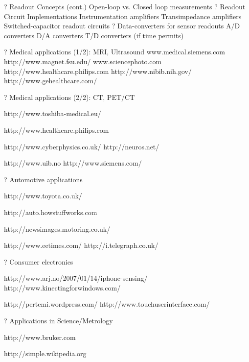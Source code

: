\documentclass[2pt,landscape]{article}
\begin{document}
\begin{multicols*}{5}
?	Readout Concepts (cont.)
\textbullet 	Open-loop vs. Closed loop measurements
?	Readout Circuit Implementations
\textbullet 	Instrumentation amplifiers
\textbullet 	Transimpedance amplifiers
\textbullet 	Switched-capacitor readout circuits
?	Data-converters for sensor readouts
\textbullet 	A/D converters
\textbullet 	D/A converters
\textbullet 	T/D converters (if time permits)



?	Medical applications (1/2): MRI, Ultrasound
www.medical.siemens.com	                    
http://www.magnet.fsu.edu/	www.sciencephoto.com
http://www.healthcare.philips.com	http://www.nibib.nih.gov/	http://www.gehealthcare.com/



?	Medical applications (2/2): CT, PET/CT


http://www.toshiba-medical.eu/

http://www.healthcare.philips.com


http://www.cyberphysics.co.uk/	http://neuros.net/

http://www.uib.no	http://www.siemens.com/



?	Automotive applications




http://www.toyota.co.uk/


http://auto.howstuffworks.com


http://newsimages.motoring.co.uk/






http://www.eetimes.com/
http://i.telegraph.co.uk/



?	Consumer electronics

http://www.arj.no/2007/01/14/iphone-sensing/	http://www.kinectingforwindows.com/

http://pertemi.wordpress.com/	http://www.touchuserinterface.com/



?	Applications in Science/Metrology

















http://www.bruker.com


http://simple.wikipedia.org



\end{multicols*}
\end{document}
